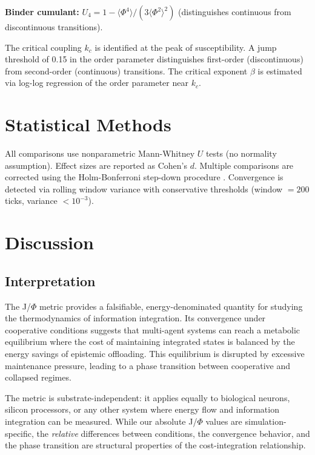 \documentclass[entropy,article]{Definitions/mdpi}
\begin{document}
\textbf{Binder cumulant:} $U_4 = 1 - \langle\Phi^4\rangle / (3\langle\Phi^2\rangle^2)$ (distinguishes continuous from discontinuous transitions).

The critical coupling $k_c$ is identified at the peak of susceptibility. A jump threshold of 0.15 in the order parameter distinguishes first-order (discontinuous) from second-order (continuous) transitions. The critical exponent $\beta$ is estimated via log-log regression of the order parameter near $k_c$.

\section{Statistical Methods}
\label{sec:stats}

All comparisons use nonparametric Mann-Whitney $U$ tests (no normality assumption). Effect sizes are reported as Cohen's $d$. Multiple comparisons are corrected using the Holm-Bonferroni step-down procedure \citep{holm1979}. Convergence is detected via rolling window variance with conservative thresholds (window $= 200$ ticks, variance $< 10^{-3}$).

\section{Discussion}
\label{sec:discussion}

\subsection{Interpretation}

The J/$\Phi$ metric provides a falsifiable, energy-denominated quantity for studying the thermodynamics of information integration. Its convergence under cooperative conditions suggests that multi-agent systems can reach a metabolic equilibrium where the cost of maintaining integrated states is balanced by the energy savings of epistemic offloading. This equilibrium is disrupted by excessive maintenance pressure, leading to a phase transition between cooperative and collapsed regimes.

The metric is substrate-independent: it applies equally to biological neurons, silicon processors, or any other system where energy flow and information integration can be measured. While our absolute J/$\Phi$ values are simulation-specific, the \emph{relative} differences between conditions, the convergence behavior, and the phase transition are structural properties of the cost-integration relationship.
\end{document}
